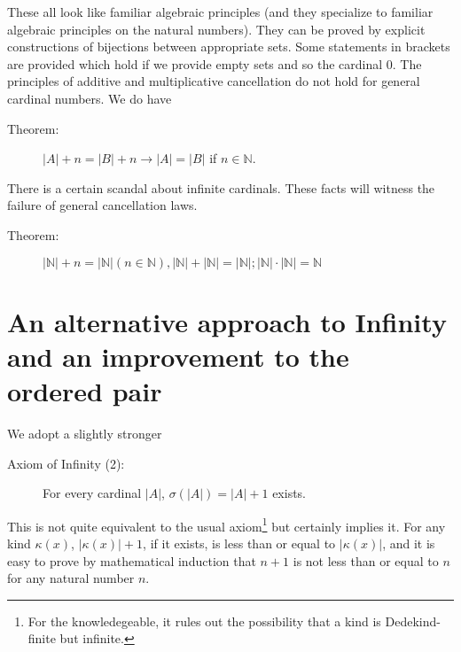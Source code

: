\documentclass[12pt]{article}
\begin{document}
\begin{description}
\begin{enumerate}
\end{enumerate}

These all look like familiar algebraic principles (and they specialize to familiar algebraic principles on the natural numbers).  They can be proved by explicit constructions of bijections between appropriate sets.  Some statements in brackets are provided which hold if we provide empty sets and so the cardinal 0.  The principles of additive and multiplicative cancellation do not hold for general cardinal numbers.
We do have 

\begin{description}

\item[Theorem:]  $|A|+n = |B|+n \rightarrow |A|=|B|$ if $n \in {\mathbb N}$.

\end{description}

There is a certain scandal about infinite cardinals.  These facts will witness the failure of general cancellation laws.

\begin{description}

\item[Theorem:]  $|\mathbb N|+n = |\mathbb N| (n \in \mathbb N), |\mathbb N|+|\mathbb N|=|\mathbb N|;  |\mathbb N|\cdot|\mathbb N|= \mathbb N$

\end{description}

\end{description}


\section{An alternative approach to Infinity and an improvement to the ordered pair}

We adopt a slightly stronger

\begin{description}

\item[Axiom of Infinity (2):]  For every cardinal $|A|$, $\sigma(|A|) = |A|+1$ exists.

\end{description}

This is not quite equivalent to the usual axiom\footnote{For the knowledegeable, it rules out the possibility that a kind is Dedekind-finite but infinite.} but certainly implies it.  For any kind $\kappa(x)$, $|\kappa(x)|+1$, if it exists, is less than or equal to $|\kappa(x)|$, and it is easy to prove by mathematical induction that $n+1$ is not less than or equal to $n$ for any natural number $n$.
\end{document}
